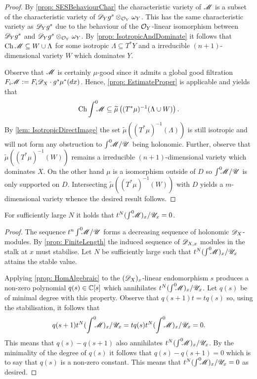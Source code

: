 \begin{proof}
  By \cref{prop: SESBehaviourChar} the characteristic variety of $\mathscr{M}$ is a subset of the characteristic variety of $\mathscr{D}_Yg^s \otimes_{\mathcal{O}_Y} \omega_Y$.
  This has the same characteristic variety as $\mathscr{D}_Y g^s$ due to the behaviour of the $\mathcal{O}_Y$-linear isomorphism between $\mathscr{D}_Yg^s$ and $\mathscr{D}_Yg^s \otimes_{\mathcal{O}_Y} \omega_Y$.
  By \cref{prop: IsotropicAndDominate} it follows that $\operatorname{Ch} \mathscr{M} \subseteq W \cup \Lambda$ for some isotropic $\Lambda\subseteq T^*Y$ and a irreducible $(n+1)$-dimensional variety $W$ which dominates $Y$.

  Observe that $\mathscr{M}$ is certainly $\mu$-good since it admits a global good filtration $F_i\mathscr{M} := F_i\mathscr{D}_X \cdot g^s \mu^*(dx)$.
  Hence, \cref{prop: EstimateProper} is applicable and yields that
  $$\operatorname{Ch} \int^0 \mkern -8mu \mathscr{M} \subseteq \widetilde{\mu}\left((T^*\mu)^{-1} (\Lambda \cup W)\right).$$
  By \cref{lem: IsotropicDirectImage} the set $\widetilde{\mu}((T^*\mu)^{-1}(\Lambda))$ is still isotropic and will not form any obstruction to $\int^0 \mkern -8mu\mathscr{M}/\mathscr{U}$ being holonomic.
  Further, observe that $\widetilde{\mu}((T^*\mu)^{-1}(W))$ remains a irreducible $(n+1)$-dimensional variety which dominates $X$.
  On the other hand $\mu$ is a isomorphism outside of $D$ so $\int^0 \mkern -8mu\mathscr{M}/\mathscr{U}$ is only supported on $D$.
  Intersecting $\widetilde{\mu}((T^*\mu)^{-1}(W))$ with $D$ yields a $m$-dimensional variety whence the desired result follows.
\end{proof}
\begin{proposition}\label{prop: StableZero}
  For sufficiently large $N$ it holds that $t^N (\int^0 \mkern -8mu \mathscr{M})_x / \mathscr{U}_x = 0$.
\end{proposition}
\begin{proof}
  The sequence $t^n \int^0 \mkern -8mu\mathscr{M} / \mathscr{U}$ forms a decreasing sequence of holonomic $\mathscr{D}_X$-modules.
  By \cref{prop: FiniteLength} the induced sequence of $\mathscr{D}_{X,x}$ modules in the stalk at $x$ must stabilise.
  Let $N$ be sufficiently large such that $t^N(\int^0 \mkern -8mu\mathscr{M})_x/\mathscr{U}_x$ attains the stable value.

  Applying \cref{prop: HomAlgebraic} to the $(\mathscr{D}_X)_x$-linear endomorphism $s$ produces a non-zero polynomial $q(s)\in \mathbb{C}[s]$ which annihilates $t^N(\int^0 \mkern -8mu\mathscr{M})_x/\mathscr{U}_x$.
  Let $q(s)$ be of minimal degree with this property.
  Observe that $q(s+1)t = tq(s)$ so, using the stabilisation, it follows that
  $$q(s+1)t^N(\int^0 \mkern -8mu\mathscr{M})_x/\mathscr{U}_x = t q(s) t^N(\int^0 \mkern -8mu\mathscr{M})_x/\mathscr{U}_x = 0.$$
  This means that $q(s) - q(s+1)$ also annihilates $t^N(\int^0 \mkern -8mu\mathscr{M})_x/\mathscr{U}_x$.
  By the minimality of the degree of $q(s)$ it follows that $q(s) - q(s+1)=0$ which is to say that $q(s)$ is a non-zero constant.
  This means that $t^N(\int^0 \mkern -8mu\mathscr{M})_x/\mathscr{U}_x = 0 $ as desired.
\end{proof}
